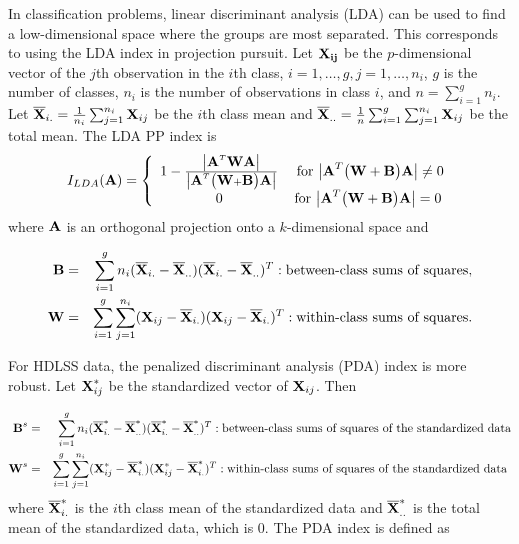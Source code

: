 In classification problems, linear discriminant analysis (LDA) can be used to find a low-dimensional space where the groups are most separated. This corresponds to using the LDA index \citep{lee:2009} in projection pursuit. Let $\bf{X_{ij}}$ be the $p$-dimensional vector of the $j$th observation in the $i$th class, $i = 1, \dots, g, j = 1, \dots, n_i$, $g$ is the number of classes, $n_i$ is the number of observations in class $i$, and $n = \sum_{i = 1}^g n_i$. Let $\overline{\mbox{\boldmath {\bf X}}}_{i.} = \frac{1}{n_i} \sum_{j=1}^{n_i} \mbox{\boldmath {\bf X}}_{ij}$
be the $i$th class mean and $\overline{\mbox{\boldmath {\bf X}}}_{..} =
\frac{1}{n}\sum_{i=1}^g \sum_{j=1}^{n_i} \mbox{\boldmath {\bf X}}_{ij}$ be the total
mean. The LDA PP index is
\begin{equation}
I_{LDA} ({\mbox{\boldmath {\bf A}}}) = \left \{ \begin{array}{cc}
                       1-\frac{\big|{\mbox{\boldmath {\bf A}}}^T\mbox{\boldmath {\bf W}}{\mbox{\boldmath {\bf A}}}\big|}{\big|{\mbox{\boldmath {\bf A}}}^T\big
                                  (\mbox{\boldmath {\bf W}} + \mbox{\boldmath {\bf B}}\big){\mbox{\boldmath {\bf A}}}\big|} &
                       \mbox{ for $\big|{\mbox{\boldmath {\bf A}}}^T\big(\mbox{\boldmath {\bf W}} + \mbox{\boldmath {\bf B}}\big) {\mbox{\boldmath {\bf A}}}\big| \ne 0$}\\
                       0 & \mbox{for  $\big|{\mbox{\boldmath {\bf A}}}^T\big(\mbox{\boldmath {\bf W}} + \mbox{\boldmath {\bf B}}\big) {\mbox{\boldmath {\bf A}}}\big| = 0$}
                       \end{array}
               \right.
\end{equation}
where $\mbox{\boldmath {\bf A}}$ is an orthogonal projection onto a $k$-dimensional space and

\begin{eqnarray}
 \mbox{\boldmath {\bf B}}&=&\sum_{i=1}^g n_i (\overline{\mbox{\boldmath {\bf X}}}_{i.} - \overline{\mbox{\boldmath {\bf X}}}_{..})(\overline{\mbox{\boldmath {\bf X}}}_{i.}
  - \overline{\mbox{\boldmath {\bf X}}}_{..})^T
:  \mbox{between-class sums of squares}, \nonumber\\
\mbox{\boldmath {\bf W}}&=&\sum_{i=1}^g \sum_{j=1}^{n_i} (\mbox{\boldmath {\bf X}}_{ij} -
\overline{\mbox{\boldmath {\bf X}}}_{i.})(\mbox{\boldmath {\bf X}}_{ij} - \overline{\mbox{\boldmath {\bf X}}}_{i.})^T :
\mbox{within-class sums of squares}.\nonumber
\end{eqnarray}

For HDLSS data, the penalized discriminant analysis (PDA) index \citep{lee:2009} is more robust. Let ${\mbox{\boldmath {\bf X}}}_{ij}^*$ be the standardized vector of ${\mbox{\boldmath {\bf X}}}_{ij}$. Then 

\begin{eqnarray}
 \mbox{\boldmath {\bf B}}^s&=&\sum_{i=1}^g n_i (\overline{\mbox{\boldmath {\bf X}}}^*_{i.} - \overline{\mbox{\boldmath {\bf X}}}^*_{..})(\overline{\mbox{\boldmath {\bf X}}}^*_{i.}
  - \overline{\mbox{\boldmath {\bf X}}}^*_{..})^T: \hbox{between-class sums of squares of the standardized data}\nonumber\\
\mbox{\boldmath {\bf W}}^s&=&\sum_{i=1}^g \sum_{j=1}^{n_i} (\mbox{\boldmath {\bf X}}^*_{ij} -
\overline{\mbox{\boldmath {\bf X}}}^*_{i.})(\mbox{\boldmath {\bf X}}^*_{ij} - \overline{\mbox{\boldmath {\bf X}}}^*_{i.})^T: \hbox{within-class sums of squares of the standardized data }\nonumber
\end{eqnarray}
where $\overline{\mbox{\boldmath {\bf X}}}^*_{i.}$ is the $i$th class mean of the standardized data and $\overline{\mbox{\boldmath {\bf X}}}^*_{..}$ is the
total mean of the standardized data, which is 0. The PDA index is defined as

